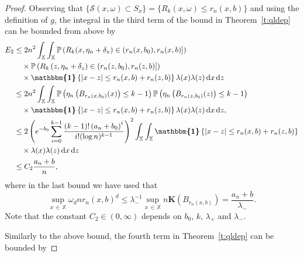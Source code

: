 \documentclass[10pt]{amsart}
\theoremstyle{definition}\newtheorem{defi}[theo]{Definition}\newtheorem{rema}[theo]{Remark}\newtheorem{exam}[theo]{Example}\newtheorem{exem}[theo]{Example}\newtheorem{nota}[theo]{Notation}
\newcommand*\bK{\mathbf{K}}
\renewcommand*\P{\mathbb{P}}
\newcommand*\X{\mathbb{X}}
\newcommand*\cS{\mathcal{S}}
\newcommand*\md{\mathrm{d}}
\newcommand{\ind}{\boldsymbol{\mathbbm{1}}}
\newcommand{\set}[1]{\left\{#1\right\}}
\newcommand{\param}[1]{\left(#1\right)}
\newcommand{\prob}[1]{\P\left(#1\right)}
\begin{document}
\begin{proof}
Observing that $\{\cS(x,\omega) \subset S_x \} = \{R_k(x,\omega) \leq r_n(x,b) \}$ and using the definition of $g$, the integral in the third term of the bound in Theorem~\ref{t:qldep} can be bounded from above by
\begin{equation}\label{e:knngt3}
\begin{split}
E_2
&\leq {2} n^2 \int_{\X}\int_{\X} \prob{R_k(x,\eta_n + \delta_x) \in \left(r_n(x,b_0),r_n(x,b)\right]}\\
&\quad\times\prob{R_k\left(z,\eta_n + \delta_z\right) \in \left(r_n(z,b_0),r_n(z,b)\right]}\\
& \quad\times \ind\set{|x-z| \leq r_n(x,b) + r_n(z,b)} \lambda(x)\lambda(z) \, \md x \, \md z\\
& \leq {2} n^2 \int_{\X}\int_{\X} \prob{\eta_n\left(B_{r_n(x,b_0)}(x)\right) \leq k-1}\prob{\eta_n\left(B_{r_n(z,b_0)}(z)\right) \leq k-1} \\
& \quad\times \ind\set{|x-z| \leq r_n(x,b) + r_n(z,b)} \lambda(x)\lambda(z) \, \md x \, \md z, \\
& \leq {2} \param{e^{-b_0} \sum_{i=0}^{k-1} \frac{(k-1)!\left(a_n+b_0\right)^i}{ i! (\log n)^{k-1}}}^2 \int_{\X}\int_{\X} \ind\set{|x-z| \leq r_n(x,b) + r_n(z,b)} \\
&\quad\times\lambda(x)\lambda(z) \, \md x \, \md z \\
& \leq C_2 \frac{a_n + b}{n},
\end{split}
\end{equation}
where in the last bound we have used that 
\[
\sup_{x\, \in\,\X}\omega_dnr_n(x,b)^d \leq \lambda_-^{-1} \sup_{x\,\in\,\X} n\bK\left(B_{r_n(x,b)}\right) =\frac{a_n + b}{\lambda_-}.
\]
Note that the constant $C_2\in(0,\infty)$ depends on $b_0$, $k$, $\lambda_+$ and $\lambda_-$.

Similarly to the above bound, the fourth term in Theorem~\ref{t:qldep} can be bounded by



\end{proof}
\end{document}
